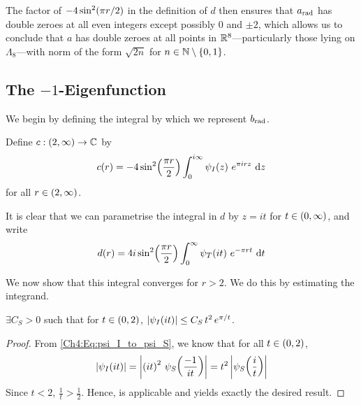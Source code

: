 The factor of $-4\sin^2\!\left( \pi r / 2 \right)$ in the definition of $d$ then ensures that $a_{\operatorname{rad}}$ has double zeroes at all even integers except possibly $0$ and $\pm 2$, which allows us to conclude that $a$ has double zeroes at all points in $\mathbb{R}^8$---particularly those lying on $\Lambda_8$---with norm of the form $\sqrt{2n}$ for $n \in \mathbb{N} \setminus \left\{ 0, 1 \right\}$.

\subsection{The $-1$-Eigenfunction}

We begin by defining the integral by which we represent $b_{\operatorname{rad}}$.

\begin{boxdefinition}
    Define $c : \left( 2, \infty \right) \to \mathbb{C}$ by
    \begin{align*}
        c\!\left( r \right) = -4 \sin^2\!\left( \frac{\pi r}{2} \right) \int_{0}^{i\infty} \psi_I\!\left( z \right) \, e^{\pi i r z} \, \operatorname{d}\!{z}
    \end{align*}
    for all $r \in \left( 2, \infty \right)$.
\end{boxdefinition}

It is clear that we can parametrise the integral in $d$ by $z = it$ for $t \in \left( 0, \infty \right)$, and write
\begin{align}
    d(r) = 4i \sin^2\!\left( \frac{\pi r}{2} \right) \int_{0}^{\infty} \psi_T\!\left( it \right) \, e^{-\pi r t} \, \operatorname{d}\!{t}
    \label{Ch4:Eq:c_parametrised}
\end{align}

We now show that this integral converges for $r > 2$. We do this by estimating the integrand.

\begin{boxlemma}
    $\exists C_S > 0$ such that for $t \in \left( 0, 2 \right)$, $\left\lvert \psi_I\!\left( it \right) \right\rvert \leq C_S \, t^2 \, e^{\pi / t}$.
\end{boxlemma}
\begin{proof}
    From \eqref{Ch4:Eq:psi_I_to_psi_S}, we know that for all $t \in \left( 0, 2 \right)$,
    \begin{align*}
        \left\lvert \psi_I\!\left( it \right) \right\rvert
        = \left\lvert \left( it \right)^2 \, \psi_S\!\left( \frac{-1}{it} \right) \right\rvert
        = t^2 \left\lvert \psi_S\!\left( \frac{i}{t} \right) \right\rvert
    \end{align*}
    Since $t < 2$, $\frac{1}{t} > \frac{1}{2}$. Hence,  is applicable and yields exactly the desired result.
\end{proof}


